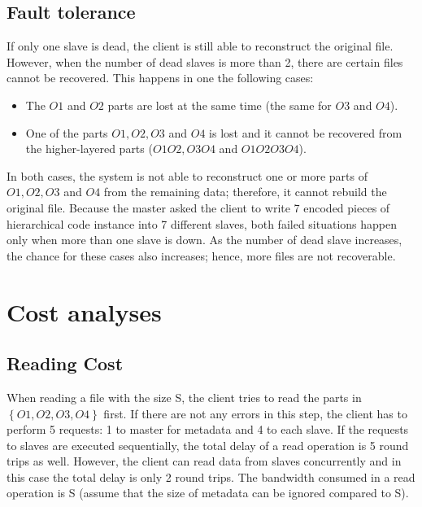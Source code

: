 \documentclass[conference]{IEEEtran}
\begin{document}
\subsection{Fault tolerance}
If only one slave is dead, the client is still able to reconstruct the original file. However, when the number of dead slaves is more than 2, there are certain files cannot be recovered. This happens in one the following cases:
\begin{itemize}
\item The $O1$ and $O2$ parts are lost at the same time (the same for $O3$ and $O4$).
\item	One of the parts $O1, O2, O3$ and $O4$ is lost and it cannot be recovered from the higher-layered parts ($O1O2, O3O4$ and $O1O2O3O4$).
\end{itemize}
In both cases, the system is not able to reconstruct one or more parts of $O1, O2, O3$ and $O4$ from the remaining data; therefore, it cannot rebuild the original file. Because the master asked the client to write 7 encoded pieces of hierarchical code instance into 7 different  slaves, both failed situations happen only when more than one slave is down. As the number of dead slave increases, the chance for these cases also increases; hence, more files are not recoverable.

\section{Cost analyses}
\subsection{Reading Cost}
When reading a file with the size S, the client tries to read the parts in $\left\{O1, O2, O3, O4\right\}$ first. If there are not any errors in this step, the client has to perform 5 requests: 1 to master for metadata and 4 to each slave. If the requests to slaves are executed sequentially, the total delay of a read operation is 5 round trips as well. However, the client can read data from slaves concurrently and in this case the total delay is only 2 round trips. The bandwidth consumed in a read operation is S (assume that the size of metadata can be ignored compared to S).
\end{document}
